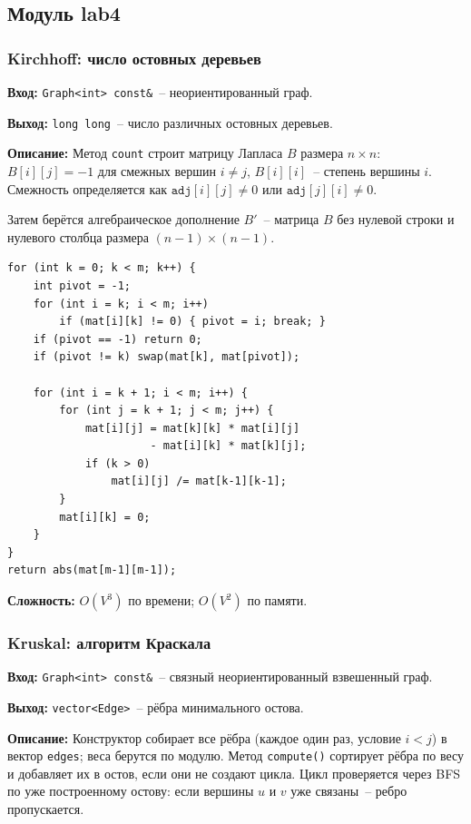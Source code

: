 \subsection{Модуль lab4}

\subsubsection{Kirchhoff: число остовных деревьев}

\textbf{Вход:} \texttt{Graph<int> const\&}~-- неориентированный граф.

\textbf{Выход:} \texttt{long long}~-- число различных остовных деревьев.

\textbf{Описание:} Метод \texttt{count} строит матрицу Лапласа $B$
размера $n \times n$: $B[i][j] = -1$ для смежных вершин $i \neq j$,
$B[i][i]$~-- степень вершины $i$. Смежность определяется как
$\texttt{adj}[i][j] \neq 0$ или $\texttt{adj}[j][i] \neq 0$.

Затем берётся алгебраическое дополнение $B'$~-- матрица $B$ без нулевой
строки и нулевого столбца размера $(n-1) \times (n-1)$.

\begin{lstlisting}[style=cstyle, caption={Алгоритм Барейсса(kirchhoff.cpp)}]
for (int k = 0; k < m; k++) {
    int pivot = -1;
    for (int i = k; i < m; i++)
        if (mat[i][k] != 0) { pivot = i; break; }
    if (pivot == -1) return 0;
    if (pivot != k) swap(mat[k], mat[pivot]);

    for (int i = k + 1; i < m; i++) {
        for (int j = k + 1; j < m; j++) {
            mat[i][j] = mat[k][k] * mat[i][j]
                      - mat[i][k] * mat[k][j];
            if (k > 0)
                mat[i][j] /= mat[k-1][k-1];
        }
        mat[i][k] = 0;
    }
}
return abs(mat[m-1][m-1]);
\end{lstlisting}

\textbf{Сложность:} $O(V^3)$ по времени; $O(V^2)$ по памяти.

\subsubsection{Kruskal: алгоритм Краскала}

\textbf{Вход:} \texttt{Graph<int> const\&}~-- связный неориентированный
взвешенный граф.

\textbf{Выход:} \texttt{vector<Edge>}~-- рёбра минимального остова.

\textbf{Описание:} Конструктор собирает все рёбра (каждое один раз,
условие $i < j$) в вектор \texttt{edges}; веса берутся по модулю.
Метод \texttt{compute()} сортирует рёбра по весу и добавляет их в остов,
если они не создают цикла. Цикл проверяется через BFS по уже построенному
остову: если вершины $u$ и $v$ уже связаны~-- ребро пропускается.

